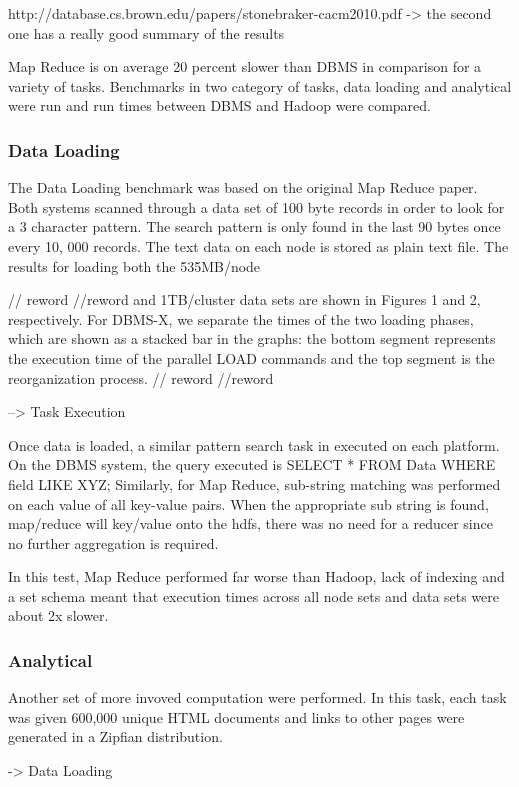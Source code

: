 \documentclass[10pt,twocolumn]{IEEEtran11}
\begin{document}
http://database.cs.brown.edu/papers/stonebraker-cacm2010.pdf
-> the second  one has a really good summary of the results

Map Reduce is on average 20 percent slower than DBMS in comparison for a variety of tasks.  Benchmarks in two category of tasks, data loading and analytical were run and run times between DBMS and Hadoop were compared.
\subsubsection{Data Loading}

The Data Loading benchmark was based on the original Map Reduce paper.  Both systems scanned through a data set of 100 byte records in order to look for a 3  character pattern.  The search pattern is only found in the last 90 bytes once every 10, 000 records.  The text data on each node is stored as plain text file.  The results for loading both the 535MB/node

// reword //reword
and 1TB/cluster data sets are shown in Figures 1 and 2, respectively.
For DBMS-X, we separate the times of the two loading phases,
which are shown as a stacked bar in the graphs: the bottom segment
represents the execution time of the parallel LOAD commands
and the top segment is the reorganization process. 
// reword //reword

--> Task Execution

Once data is loaded, a similar pattern search task in executed on each platform.  On the DBMS system, the query executed is SELECT * FROM Data WHERE field LIKE XYZ; Similarly, for Map Reduce, sub-string matching was performed on each value of all key-value pairs.  When the appropriate sub string is found, map/reduce will key/value onto the hdfs, there was no need for a reducer since no further aggregation is required.

In this test, Map Reduce performed far worse than Hadoop, lack of indexing and a set schema meant that execution times across all node sets and data sets were about 2x slower.

\subsubsection{Analytical}
Another set of more invoved computation were performed.  In this task, each task was given  600,000 unique HTML documents and links to other pages were generated
in a Zipfian distribution.

-> Data Loading
\end{document}
